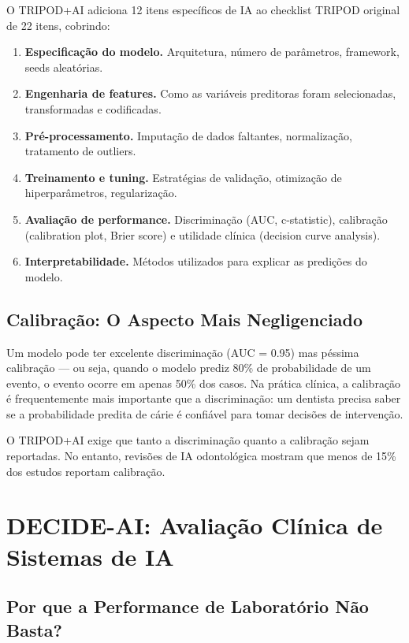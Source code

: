 O TRIPOD+AI adiciona 12 itens específicos de IA ao checklist TRIPOD original de 22 itens, cobrindo:

\begin{enumerate}
    \item \textbf{Especificação do modelo.} Arquitetura, número de parâmetros, framework, seeds aleatórias.
    \item \textbf{Engenharia de features.} Como as variáveis preditoras foram selecionadas, transformadas e codificadas.
    \item \textbf{Pré-processamento.} Imputação de dados faltantes, normalização, tratamento de outliers.
    \item \textbf{Treinamento e tuning.} Estratégias de validação, otimização de hiperparâmetros, regularização.
    \item \textbf{Avaliação de performance.} Discriminação (AUC, c-statistic), calibração (calibration plot, Brier score) e utilidade clínica (decision curve analysis).
    \item \textbf{Interpretabilidade.} Métodos utilizados para explicar as predições do modelo.
\end{enumerate}

\subsection{Calibração: O Aspecto Mais Negligenciado}

Um modelo pode ter excelente discriminação (AUC = 0.95) mas péssima calibração — ou seja, quando o modelo prediz 80\% de probabilidade de um evento, o evento ocorre em apenas 50\% dos casos. Na prática clínica, a calibração é frequentemente mais importante que a discriminação: um dentista precisa saber se a probabilidade predita de cárie é confiável para tomar decisões de intervenção.

O TRIPOD+AI exige que tanto a discriminação quanto a calibração sejam reportadas. No entanto, revisões de IA odontológica mostram que menos de 15\% dos estudos reportam calibração.

\section{DECIDE-AI: Avaliação Clínica de Sistemas de IA}

\subsection{Por que a Performance de Laboratório Não Basta?}


